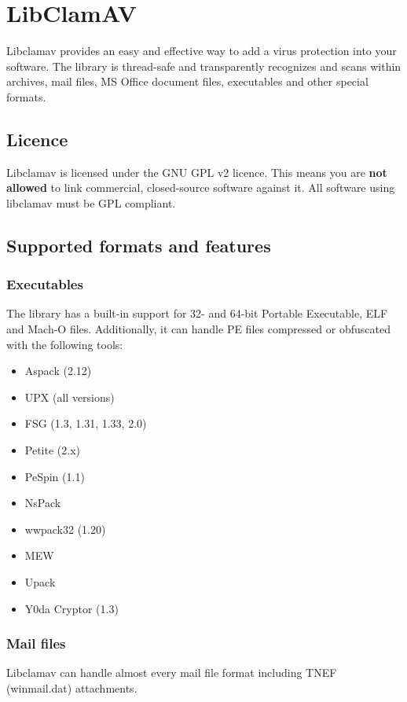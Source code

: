 \documentclass[a4paper,titlepage,12pt]{article}
\begin{document}
    \section{LibClamAV}
    Libclamav provides an easy and effective way to add a virus protection into
    your software. The library is thread-safe and transparently recognizes and
    scans within archives, mail files, MS Office document files, executables
    and other special formats.

    \subsection{Licence}
    Libclamav is licensed under the GNU GPL v2 licence. This means you are
    \textbf{not allowed} to link commercial, closed-source software
    against it. All software using libclamav must be GPL compliant.

    \subsection{Supported formats and features}

    \subsubsection{Executables}
    The library has a built-in support for 32- and 64-bit Portable Executable,
    ELF and Mach-O files. Additionally, it can handle PE files compressed or
    obfuscated with the following tools:
    \begin{itemize}
	\item Aspack (2.12)
	\item UPX (all versions)
	\item FSG (1.3, 1.31, 1.33, 2.0)
	\item Petite (2.x)
	\item PeSpin (1.1)
	\item NsPack
	\item wwpack32 (1.20)
	\item MEW
	\item Upack
	\item Y0da Cryptor (1.3)
    \end{itemize}

    \subsubsection{Mail files}
    Libclamav can handle almost every mail file format including TNEF
    (winmail.dat) attachments.
\end{document}
